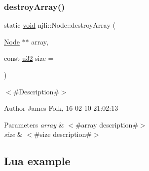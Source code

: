 \begin{DoxyCodeInclude}
\end{DoxyCodeInclude}
\mbox{\label{classnjli_1_1_node_ae9cb5171f3a98dc90911758e9d5baec4}} 
\subsubsection{\texorpdfstring{destroy\+Array()}{destroyArray()}}
{\footnotesize\ttfamily static \mbox{\hyperlink{_thread_8h_af1e856da2e658414cb2456cb6f7ebc66}{void}} njli\+::\+Node\+::destroy\+Array (\begin{DoxyParamCaption}\item[{\mbox{\hyperlink{classnjli_1_1_node}{Node}} $\ast$$\ast$}]{array,  }\item[{const \mbox{\hyperlink{_util_8h_a10e94b422ef0c20dcdec20d31a1f5049}{u32}}}]{size = {} }\end{DoxyParamCaption})\hspace{0.3cm}{\ttfamily [static]}}



$<$\#\+Description\#$>$ 

\begin{DoxyAuthor}{Author}
James Folk, 16-\/02-\/10 21\+:02\+:13
\end{DoxyAuthor}

\begin{DoxyParams}{Parameters}
{\em array} & $<$\#array description\#$>$ \\
\hline
{\em size} & $<$\#size description\#$>$\\
\hline
\end{DoxyParams}
\hypertarget{classnjli_1_1_steering_behavior_wander_ex1}{}\subsection{Lua example}\label{classnjli_1_1_steering_behavior_wander_ex1}

\begin{DoxyCodeInclude}
\end{DoxyCodeInclude}
\mbox{\label{classnjli_1_1_node_a3a62a2eed74823ed7e420beaa16f8c6f}} 
